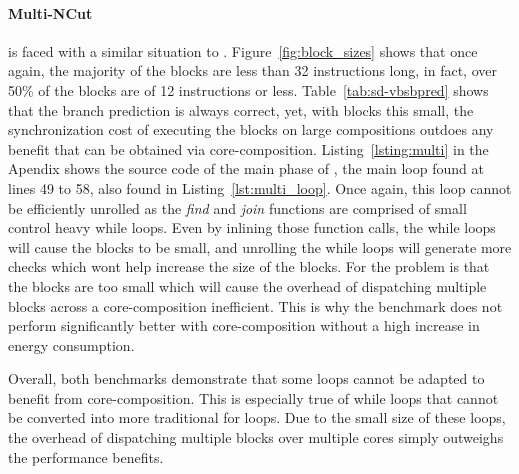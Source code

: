 \paragraph{Multi-NCut}
 is faced with a similar situation to .
Figure~\ref{fig:block_sizes} shows that once again, the majority of the blocks are less than 32 instructions long, in fact, over 50\% of the blocks are of 12 instructions or less.
Table~\ref{tab:sd-vbsbpred} shows that the branch prediction is always correct, yet, with blocks this small, the synchronization cost of executing the blocks on large compositions outdoes any benefit that can be obtained via core-composition.
Listing~\ref{lsting:multi} in the Apendix shows the source code of the main phase of , the main loop found at lines 49 to 58, also found in Listing~\ref{lst:multi_loop}.
Once again, this loop cannot be efficiently unrolled as the \textit{find} and \textit{join} functions are comprised of small control heavy while loops.
Even by inlining those function calls, the while loops will cause the blocks to be small, and unrolling the while loops will generate more checks which wont help increase the size of the blocks.
For  the problem is that the blocks are too small which will cause the overhead of dispatching multiple blocks across a core-composition inefficient.
This is why the benchmark does not perform significantly better with core-composition without a high increase in energy consumption.

Overall, both benchmarks demonstrate that some loops cannot be adapted to benefit from core-composition.
This is especially true of while loops that cannot be converted into more traditional for loops.
Due to the small size of these loops, the overhead of dispatching multiple blocks over multiple cores simply outweighs the performance benefits.
